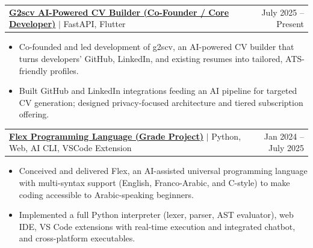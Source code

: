 \documentclass[a4, 9pt]{article}
\makeatletter
\newcommand{\resumeItem}[1]{
  \item\small{
    {#1}
  }
}
\newcommand{\resumeProjectHeading}[2]{
    \vspace{-2pt}\item
    \begin{tabular*}{0.97\textwidth}{l@{\extracolsep{\fill}}r}
      \small#1 & #2 \\
    \end{tabular*}\vspace{-7pt}
}
\newcommand{\resumeItemListStart}{\begin{itemize}}
\newcommand{\resumeItemListEnd}{\end{itemize}\vspace{-5pt}}
\makeatother
\begin{document}
    
\resumeProjectHeading
  {\textbf{\href{https://g2scv.live}{G2scv \textendash{} AI-Powered CV Builder (Co-Founder / Core Developer)}} $|$ {FastAPI, Flutter}}
  {July 2025 -- Present}
          \resumeItemListStart
            \resumeItem{Co-founded and led development of g2scv, an AI-powered CV builder that turns developers\textquoteright{} GitHub, LinkedIn, and existing resumes into tailored, ATS-friendly profiles.}
            \resumeItem{Built GitHub and LinkedIn integrations feeding an AI pipeline for targeted CV generation; designed privacy-focused architecture and tiered subscription offering.}
          \resumeItemListEnd

\resumeProjectHeading
  {\textbf{\href{https://github.com/Flex-Language}{Flex Programming Language (Grade Project)}} $|$ {Python, Web, AI CLI, VSCode Extension}}
  {Jan 2024 -- July 2025}
        \resumeItemListStart
        \resumeItem{Conceived and delivered Flex, an AI-assisted universal programming language with multi-syntax support (English, Franco-Arabic, and C-style) to make coding accessible to Arabic-speaking beginners.}
        \resumeItem{Implemented a full Python interpreter (lexer, parser, AST evaluator), web IDE, VS Code extensions with real-time execution and integrated chatbot, and cross-platform executables.}
        \resumeItemListEnd

\end{document}
